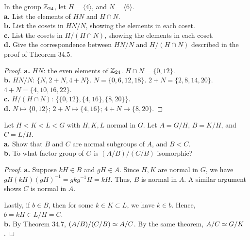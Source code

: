 \documentclass{article}
\begin{document}
 In the group $\mathbb{Z}_{24}$, let $H = \langle 4 \rangle$, and $N = \langle 6 \rangle$. \\
\textbf{a.} List the elements of $HN$ and $H\cap N$.\\
\textbf{b.} List the cosets in $HN/N$, showing the elements in each coset.\\
\textbf{c.} List the cosets in $H/(H\cap N)$, showing the elements in each coset.\\
\textbf{d.} Give the correspondence between $HN/N$ and $H/(H\cap N)$ described in the proof of Theorem 34.5.
\begin{proof}
\textbf{a.} $HN$: the even elements of $\mathbb{Z}_{24}$. $H \cap N = \{0, 12\}$.\\
\textbf{b.} $HN/N$: $\{N, 2+N, 4+N\}$. $N = \{0, 6, 12, 18\}$. $2 + N = \{2, 8, 14, 20\}$. $4+N = \{4, 10, 16, 22\}$. \\
\textbf{c.} $H/(H\cap N)$: $\{\{0,12\},\{4,16\},\{8,20\}\}$. \\
\textbf{d.} $N \mapsto \{0,12\}$; $2+N \mapsto \{4,16\}$; $4+N \mapsto \{8,20\}$.
\end{proof}

 Let $H < K < L < G$ with $H,K,L$ normal in $G$. Let $A = G/H$, $B = K/H$, and $C = L/H$. \\
\textbf{a.} Show that $B$ and $C$ are normal subgroups of $A$, and $B < C$. \\
\textbf{b.} To what factor group of $G$ is $(A/B)/(C/B)$ isomorphic?
\begin{proof}
\textbf{a.} Suppose $kH \in B$ and $gH \in A$.  Since $H,K$ are normal in $G$, we have $gH (kH) (gH)^{-1} = gkg^{-1}H = kH$. Thus, $B$ is normal in $A$. A similar argument shows $C$ is normal in $A$.

Lastly, if $b \in B$, then for some $k \in K \subset L$, we have $k \in b$.  Hence, $b = kH \in L/H = C$.
\\
\textbf{b.} By Theorem 34.7, $(A/B)/(C/B) \simeq A/C$. By the same theorem, $A/C \simeq G/K$.
\end{proof}
\end{document}
